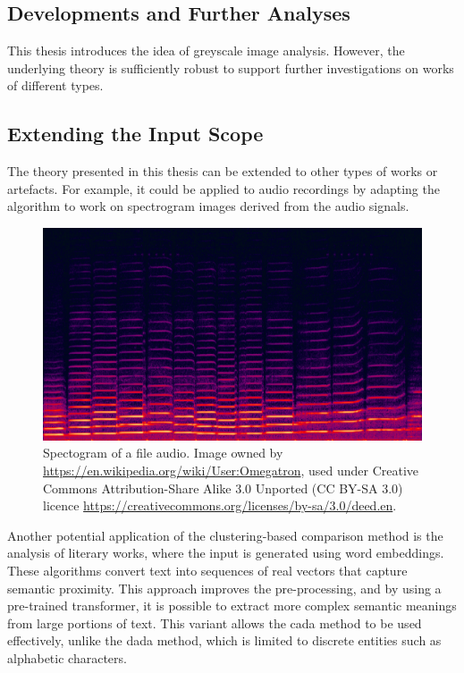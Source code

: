 \begin{toReview}
\section{Developments and Further Analyses}
This thesis introduces the idea of greyscale image analysis. However, the underlying theory is sufficiently robust to support further investigations on works of different types.

\subsection{Extending the Input Scope}
The theory presented in this thesis can be extended to other types of works or artefacts. For example, it could be applied to audio recordings by adapting the algorithm to work on spectrogram images derived from the audio signals.

\begin{figure}[h]
	\centering
	\includegraphics[width=0.8\linewidth]{Figures/Spectrogram.png}
	\caption[Spectogram of a file audio]{Spectogram of a file audio. Image owned by \url{https://en.wikipedia.org/wiki/User:Omegatron}, used under Creative Commons Attribution-Share Alike 3.0 Unported (CC BY-SA 3.0) licence \url{https://creativecommons.org/licenses/by-sa/3.0/deed.en}.}
\end{figure}

\noindent Another potential application of the clustering-based comparison method is the analysis of literary works, where the input is generated using word embeddings. These algorithms convert text into sequences of real vectors that capture semantic proximity. This approach improves the pre-processing, and by using a pre-trained transformer, it is possible to extract more complex semantic meanings from large portions of text. This variant allows the \gls{cada} method to be used effectively, unlike the \gls{dada} method, which is limited to discrete entities such as alphabetic characters.


\end{toReview}
